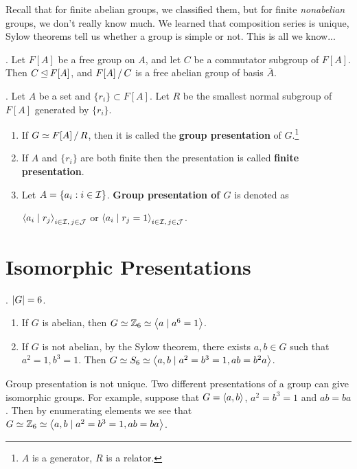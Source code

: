 
Recall that for finite abelian groups, we classified them, but for finite \textit{nonabelian} groups, we don't really know much. We learned that composition series is unique, Sylow theorems tell us whether a group is simple or not. This is all we know...

\ex. Let \(F[A]\) be a free group on \(A\), and let \(C\) be a commutator subgroup of \(F[A]\). Then \(C \unlhd F[A]\), and \(F[A] \operatorname{/} C\) is a free abelian group of basis \(\bar{A}\).

. Let \(A\) be a set and \(\{r_i\} \subset F[A]\). Let \(R\) be the smallest normal subgroup of \(F[A]\) generated by \(\{r_i\}\).
\begin{enumerate}
    \item If \(G \simeq F[A] \operatorname{/} R\), then it is called the \textbf{group presentation} of \(G\).\footnote{\(A\) is a generator, \(R\) is a relator.}
    \item If \(A\) and \(\{r_i\}\) are both finite then the presentation is called \textbf{finite presentation}.
    \item Let \(A = \{a_i : i \in \mathcal{I}\}\). \textbf{Group presentation of \(G\)} is denoted as
          \begin{center}
              \(\left\langle a_i \mid r_j \right\rangle_{i \in \mathcal{I},\, j \in \mathcal{J}}\) \quad or \quad \(\left\langle a_i \mid r_j = 1 \right\rangle_{i \in \mathcal{I},\, j \in \mathcal{J}}\).
          \end{center}
\end{enumerate}

\section*{Isomorphic Presentations}

\ex. \(\left| G \right| = 6\).
\begin{enumerate}
    \item If \(G\) is abelian, then \(G \simeq \mathbb{Z}_6 \simeq \left\langle a \mid a^6 = 1 \right\rangle\).
    \item If \(G\) is not abelian, by the Sylow theorem, there exists \(a, b \in G\) such that \(a^2 = 1, b^3 = 1\). Then \(G \simeq S_6 \simeq \left\langle a, b \mid a^2 = b^3 = 1, ab = b^2a \right\rangle\).
\end{enumerate}

\rmk Group presentation is not unique. Two different presentations of a group can give isomorphic groups. For example, suppose that \(G = \left\langle a, b \right\rangle\), \(a^2 = b^3 = 1\) and \(ab = ba\). Then by enumerating elements we see that \(G \simeq \mathbb{Z}_6 \simeq \left\langle a, b \mid a^2 = b^3 = 1, ab = ba \right\rangle\).

